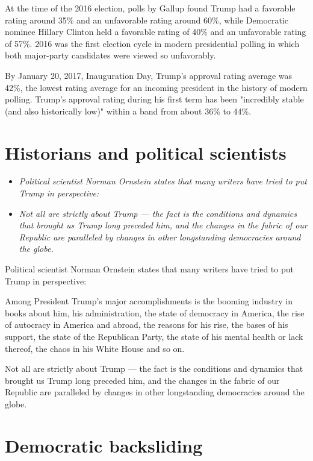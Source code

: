 At the time of the 2016 election, polls by Gallup found Trump had a
favorable rating around 35\% and an unfavorable rating around 60\%,
while Democratic nominee Hillary Clinton held a favorable rating of 40\%
and an unfavorable rating of 57\%. 2016 was the first election cycle in
modern presidential polling in which both major-party candidates were
viewed so unfavorably.

By January 20, 2017, Inauguration Day, Trump's approval rating average
was 42\%, the lowest rating average for an incoming president in the
history of modern polling. Trump's approval rating during his first term
has been "incredibly stable (and also historically low)" within a band
from about 36\% to 44\%.

\section{Historians and political
scientists}\label{historians-and-political-scientists}

\begin{itemize}
\item
  \emph{Political scientist Norman Ornstein states that many writers
  have tried to put Trump in perspective:}
\item
  \emph{Not all are strictly about Trump --- the fact is the conditions
  and dynamics that brought us Trump long preceded him, and the changes
  in the fabric of our Republic are paralleled by changes in other
  longstanding democracies around the globe.}
\end{itemize}

Political scientist Norman Ornstein states that many writers have tried
to put Trump in perspective:

Among President Trump's major accomplishments is the booming industry in
books about him, his administration, the state of democracy in America,
the rise of autocracy in America and abroad, the reasons for his rise,
the bases of his support, the state of the Republican Party, the state
of his mental health or lack thereof, the chaos in his White House and
so on.

Not all are strictly about Trump --- the fact is the conditions and
dynamics that brought us Trump long preceded him, and the changes in the
fabric of our Republic are paralleled by changes in other longstanding
democracies around the globe.

\section{Democratic backsliding}\label{democratic-backsliding}


